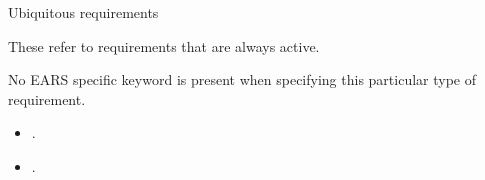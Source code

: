 \documentclass[aspectratio=169]{beamer}
\begin{document}



\begin{slide}{Ubiquitous requirements}

  These refer to requirements that are always active. 
  \begin{block}{}\centering
   
  \end{block}
  No EARS specific keyword is present when specifying this particular type of requirement.

  \begin{example}
    \begin{itemize}
      \item {} .
      \item {} .
    \end{itemize}
  \end{example}
\end{slide}

\end{document}
